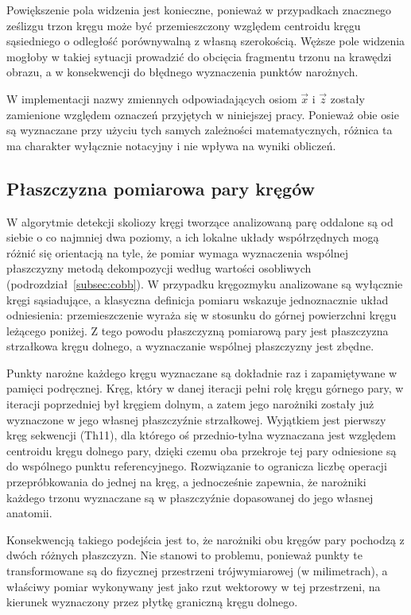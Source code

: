 Powiększenie pola widzenia jest konieczne, ponieważ w przypadkach znacznego ześlizgu trzon kręgu może być przemieszczony względem centroidu kręgu sąsiedniego o odległość porównywalną z własną szerokością.
Węższe pole widzenia mogłoby w takiej sytuacji prowadzić do obcięcia fragmentu trzonu na krawędzi obrazu, a w konsekwencji do błędnego wyznaczenia punktów narożnych.

W implementacji nazwy zmiennych odpowiadających osiom $\vec{x}$ i $\vec{z}$ zostały zamienione względem oznaczeń przyjętych w niniejszej pracy.
Ponieważ obie osie są wyznaczane przy użyciu tych samych zależności matematycznych, różnica ta ma charakter wyłącznie notacyjny i nie wpływa na wyniki obliczeń.

\subsection{Płaszczyzna pomiarowa pary kręgów}
\label{subsec:plaszczyzna-pary}

W algorytmie detekcji skoliozy kręgi tworzące analizowaną parę oddalone są od siebie o co najmniej dwa poziomy, a ich lokalne układy współrzędnych mogą różnić się orientacją na tyle, że pomiar wymaga wyznaczenia wspólnej płaszczyzny metodą dekompozycji według wartości osobliwych (podrozdział~\ref{subsec:cobb}).
W przypadku kręgozmyku analizowane są wyłącznie kręgi sąsiadujące, a klasyczna definicja pomiaru wskazuje jednoznacznie układ odniesienia: przemieszczenie wyraża się w stosunku do górnej powierzchni kręgu leżącego poniżej.
Z tego powodu płaszczyzną pomiarową pary jest płaszczyzna strzałkowa kręgu dolnego, a wyznaczanie wspólnej płaszczyzny jest zbędne.

Punkty narożne każdego kręgu wyznaczane są dokładnie raz i zapamiętywane w pamięci podręcznej.
Kręg, który w danej iteracji pełni rolę kręgu górnego pary, w iteracji poprzedniej był kręgiem dolnym, a zatem jego narożniki zostały już wyznaczone w jego własnej płaszczyźnie strzałkowej.
Wyjątkiem jest pierwszy kręg sekwencji (Th11), dla którego oś przednio-tylna wyznaczana jest względem centroidu kręgu dolnego pary, dzięki czemu oba przekroje tej pary odniesione są do wspólnego punktu referencyjnego.
Rozwiązanie to ogranicza liczbę operacji przepróbkowania do jednej na kręg, a jednocześnie zapewnia, że narożniki każdego trzonu wyznaczane są w płaszczyźnie dopasowanej do jego własnej anatomii.

Konsekwencją takiego podejścia jest to, że narożniki obu kręgów pary pochodzą z dwóch różnych płaszczyzn.
Nie stanowi to problemu, ponieważ punkty te transformowane są do fizycznej przestrzeni trójwymiarowej (w milimetrach), a właściwy pomiar wykonywany jest jako rzut wektorowy w tej przestrzeni, na kierunek wyznaczony przez płytkę graniczną kręgu dolnego.

